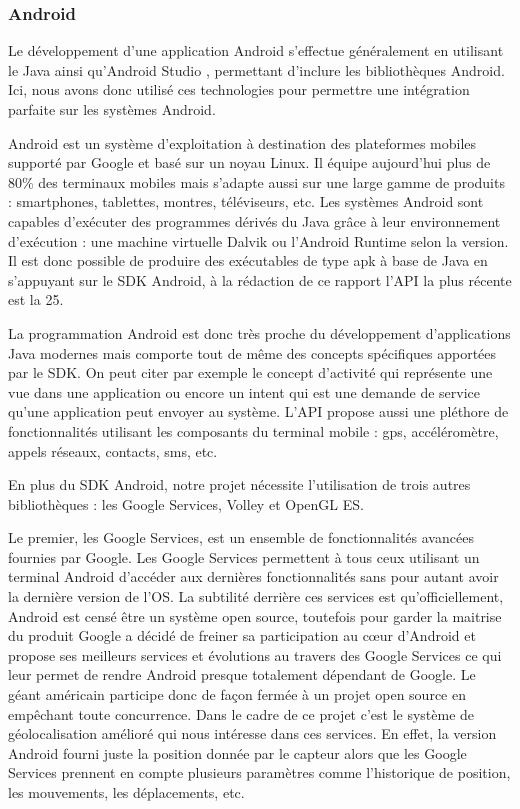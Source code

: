 \subsubsection{Android}

Le développement d'une application Android s'effectue généralement en utilisant le Java ainsi qu'Android Studio \cite{androidstudio}, permettant d'inclure les bibliothèques Android. Ici, nous avons donc utilisé ces technologies pour permettre une intégration parfaite sur les systèmes Android.

Android est un système d’exploitation à destination des plateformes mobiles supporté par Google et basé sur un noyau Linux. Il équipe aujourd’hui plus de 80\% des terminaux mobiles mais s’adapte aussi sur une large gamme de produits : smartphones, tablettes, montres, téléviseurs, etc. Les systèmes Android sont capables d’exécuter des programmes dérivés du Java grâce à leur environnement d’exécution : une machine virtuelle Dalvik ou l’Android Runtime selon la version. Il est donc possible de produire des exécutables de type apk à base de Java en s’appuyant sur le SDK Android, à la rédaction de ce rapport l’API la plus récente est la 25.

La programmation Android est donc très proche du développement d’applications Java modernes mais comporte tout de même des concepts spécifiques apportées par le SDK. On peut citer par exemple le concept d’activité qui représente une vue dans une application ou encore un intent qui est une demande de service qu’une application peut envoyer au système. L’API propose aussi une pléthore de fonctionnalités utilisant les composants du terminal mobile : gps, accéléromètre, appels réseaux, contacts, sms, etc.

En plus du SDK Android, notre projet nécessite l’utilisation de trois autres bibliothèques : les Google Services, Volley et OpenGL ES. 

Le premier, les Google Services, est un ensemble de fonctionnalités avancées fournies par Google. Les Google Services permettent à tous ceux utilisant un terminal Android d’accéder aux dernières fonctionnalités sans pour autant avoir la dernière version de l’OS. La subtilité derrière ces services est qu’officiellement, Android est censé être un système open source, toutefois pour garder la maitrise du produit Google a décidé de freiner sa participation au cœur d’Android et propose ses meilleurs services et évolutions au travers des Google Services ce qui leur permet de rendre Android presque totalement dépendant de Google. Le géant américain participe donc de façon fermée à un projet open source en empêchant toute concurrence. Dans le cadre de ce projet c’est le système de géolocalisation amélioré qui nous intéresse dans ces services. En effet, la version Android fourni juste la position donnée par le capteur alors que les Google Services prennent en compte plusieurs paramètres comme l’historique de position, les mouvements, les déplacements, etc.

